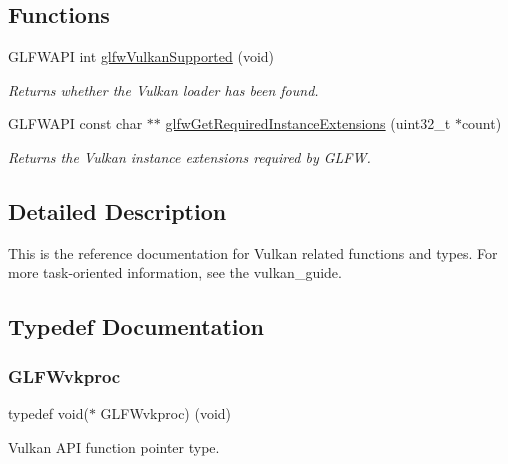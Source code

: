 \subsection*{Functions}
\begin{DoxyCompactItemize}
\item 
G\+L\+F\+W\+A\+PI int \hyperlink{group__vulkan_ga72e7c3757d9ff2333181a5569bb7c403}{glfw\+Vulkan\+Supported} (void)
\begin{DoxyCompactList}\small\item\em Returns whether the Vulkan loader has been found. \end{DoxyCompactList}\item 
G\+L\+F\+W\+A\+PI const char $\ast$$\ast$ \hyperlink{group__vulkan_gada152edc5bbbd0c2138728878632fd9c}{glfw\+Get\+Required\+Instance\+Extensions} (uint32\+\_\+t $\ast$count)
\begin{DoxyCompactList}\small\item\em Returns the Vulkan instance extensions required by G\+L\+FW. \end{DoxyCompactList}\end{DoxyCompactItemize}


\subsection{Detailed Description}
This is the reference documentation for Vulkan related functions and types. For more task-\/oriented information, see the vulkan\+\_\+guide. 

\subsection{Typedef Documentation}
\mbox{\label{group__vulkan_ga70c01918dc9d233a4fbe0681a43018af}} 
\subsubsection{\texorpdfstring{G\+L\+F\+Wvkproc}{GLFWvkproc}\hspace{0.1cm}{\footnotesize\ttfamily [1/5]}}
{\footnotesize\ttfamily typedef void($\ast$ G\+L\+F\+Wvkproc) (void)}



Vulkan A\+PI function pointer type. 

